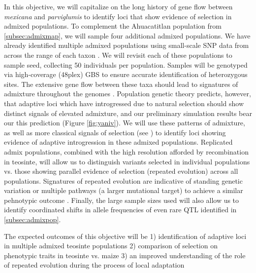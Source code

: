 In this objective, we will capitalize on the long history of gene flow between \emph{mexicana} and \emph{parviglumis} \citep{Ross-Ibarra2009a} to identify loci that show evidence of selection in admixed populations. To complement the Ahuacatitlan population from \ref{subsec:admixmap}, we will sample four additional admixed populations.  We have already identified multiple admixed populations using small-scale SNP data from across the range of each taxon \citep{vanheerwaarden2011a}.  We will revisit each of these populations to sample seed, collecting 50 individuals per population.  Samples will be genotyped via high-coverage (48plex) GBS to ensure accurate identification of heterozygous sites. The extensive gene flow between these taxa should lead to signatures of admixture throughout the genomes \citep{Pyhajarvi2013}.  Population genetic theory predicts, however, that adaptive loci which have introgressed due to natural selection should show distinct signals of elevated admixture, and our preliminary simulation results bear our this prediction (Figure \ref{fig:yaniv}). We will use these patterns of admixture, as well as more classical signals of selection (see \label{subsec:intropopgen}) to identify loci showing evidence of adaptive introgression in these admixed populations.  Replicated admix populations, combined with the high resolution afforded by recombination in teosinte, will allow us to distinguish variants selected in individual populations vs. those showing parallel evidence of selection (repeated evolution) across all populations.  Signatures of repeated evolution are indicative of standing genetic variation or multiple pathways (a larger mutational target) to achieve a similar pehnotypic outcome \citep{Ralph2010a}. Finally, the large sample sizes used will also allow us to identify coordinated shifts in allele frequencies \citet{Berg2013} of even rare QTL identified in \ref{subsec:admixpop}.

The expected outcomes of this objective will be 1) identification of adaptive loci in multiple admixed teosinte populations 2) comparison of selection on phenotypic traits in teosinte vs. maize 3) an improved understanding of the role of repeated evolution during the process of local adaptation 

